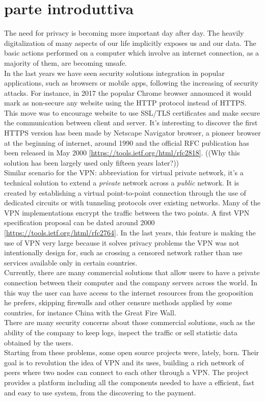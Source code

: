 \documentclass[]{article}
\begin{document}
	\section{parte introduttiva}
	
	The need for privacy is becoming more important day after day. The heavily digitalization of many aspects of our life implicitly exposes  us and our data. The basic actions performed on a computer which involve an internet connection, as a majority of them, are becoming unsafe.\\
	In the last years we have seen security solutions integration in popular applications, such as browsers or mobile apps, following the increasing of security attacks. For instance, in 2017 the popular Chrome browser announced it would mark as non-secure any website using the HTTP protocol instead of HTTPS. This move was to encourage website to use SSL/TLS certificates and make secure the communication between client and server. It's interesting to discover the first HTTPS version has been made by Netscape Navigator browser, a pioneer browser at the beginning of internet, around 1990 and the official RFC publication has been released in May 2000 \ref{https://tools.ietf.org/html/rfc2818}. ((Why this solution has been largely used only fifteen years later?))\\	
	Similar scenario for the VPN: abbreviation for virtual private network, it's a technical solution to extend a \textit{private} network across a \textit{public} network. It is created by establishing a virtual point-to-point connection through the use of dedicated circuits or with tunneling protocols over existing networks. Many of the VPN implementations encrypt the traffic between the two points. A first VPN specification proposal can be dated around 2000 \ref{https://tools.ietf.org/html/rfc2764}. In the last years, this feature is making the use of VPN very large because it solves privacy problems the VPN was not intentionally design for, such as crossing a censored network rather than use services available only in certain countries.\\
	Currently, there are many commercial solutions that allow users to have a private connection between their computer and the company servers across the world. In this way the user can have access to the internet resources from the geoposition he prefers, skipping firewalls and other censure methods applied by some countries, for instance China with the Great Fire Wall.\\
	There are many security concerns about those commercial solutions, such as the ability of the company to keep logs, inspect the traffic or sell statistic data obtained by the users.\\
	Starting from these problems, some open source projects were, lately, born. Their goal is to revolution the idea of VPN and its uses, building a rich network of peers where two nodes can connect to each other through a VPN. The project provides a platform including all the components needed to have a efficient, fast and easy to use system, from the discovering to the payment.\\
	
\end{document}
